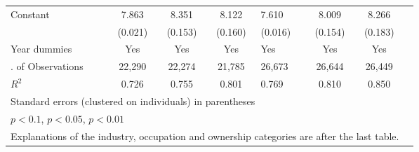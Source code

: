 \begin{longtable}{l*{3}{c}|l*{3}{c}}
	Constant            &       7.863\sym{***}&       8.351\sym{***}&       8.122\sym{***}&       7.610\sym{***}&       8.009\sym{***}&       8.266\sym{***}\\
	&     (0.021)         &     (0.153)         &     (0.160)         &     (0.016)         &     (0.154)         &     (0.183)         \\
	Year dummies        &         Yes         &         Yes         &         Yes         &         Yes         &         Yes         &         Yes         \\
	\midrule
	\No. of	Observations        &       22,290         &       22,274         &       21,785         &       26,673         &       26,644         &       26,449         \\
	\(R^{2}\)  &       0.726         &       0.755         &       0.801         &       0.769         &       0.810         &       0.850         \\
	\bottomrule
	\multicolumn{7}{l}{\footnotesize Standard errors (clustered on individuals) in parentheses}\\
	\multicolumn{7}{l}{\footnotesize \sym{*} \(p<0.1\), \sym{**} \(p<0.05\), \sym{***} \(p<0.01\)} \\
	\multicolumn{7}{l}{Explanations of the industry, occupation and ownership categories are after the last table.}
	\label{tab:et_wage_full}
\end{longtable}
